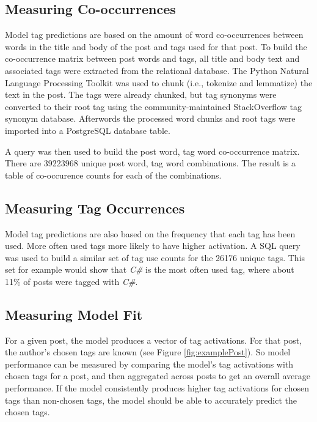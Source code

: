 \documentclass[10pt,letterpaper]{article}
\begin{document}
\subsection{Measuring Co-occurrences}

Model tag predictions are based on the amount of word co-occurrences between words in the title and body of the post and tags used for that post.
To build the co-occurrence matrix between post words and tags, all title and body text and associated tags were extracted from the relational database.
The Python Natural Language Processing Toolkit \cite{Bird2009} was used to chunk (i.e., tokenize and lemmatize) the text in the post.
The tags were already chunked, but tag synonyms were converted to their root tag using the community-maintained StackOverflow tag synonym database.
Afterwords the processed word chunks and root tags were imported into a PostgreSQL database table.

A query was then used to build the post word, tag word co-occurrence matrix.
There are \num{39223968} unique post word, tag word combinations.
The result is a table of co-occurence counts for each of the combinations.

\subsection{Measuring Tag Occurrences}

Model tag predictions are also based on the frequency that each tag has been used.
More often used tags more likely to have higher activation.
A SQL query was used to build a similar set of tag use counts for the \num{26176} unique tags.
This set for example would show that \emph{C\#} is the most often used tag, where about 11\% of posts were tagged with \emph{C\#}.

\subsection{Measuring Model Fit}

For a given post, the model produces a vector of tag activations.
For that post, the author's chosen tags are known (see Figure \ref{fig:examplePost}).
So model performance can be measured by comparing the model's tag activations with chosen tags for a post, and then aggregated across posts to get an overall average performance.
If the model consistently produces higher tag activations for chosen tags than non-chosen tags, the model should be able to accurately predict the chosen tags.
\end{document}
